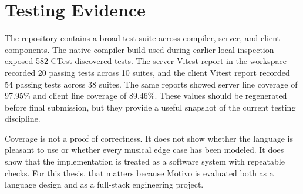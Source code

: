 \section{Testing Evidence}\label{sec:test-evidence}

The repository contains a broad test suite across compiler, server, and client components.
The native compiler build used during earlier local inspection exposed 582 CTest-discovered tests.
The server Vitest report in the workspace recorded 20 passing tests across 10 suites, and the client Vitest report
recorded 54 passing tests across 38 suites.
The same reports showed server line coverage of 97.95\% and client line coverage of 89.46\%.
These values should be regenerated before final submission, but they provide a useful snapshot of the current testing
discipline.

Coverage is not a proof of correctness.
It does not show whether the language is pleasant to use or whether every musical edge case has been modeled.
It does show that the implementation is treated as a software system with repeatable checks.
For this thesis, that matters because Motivo is evaluated both as a language design and as a full-stack engineering
project.
